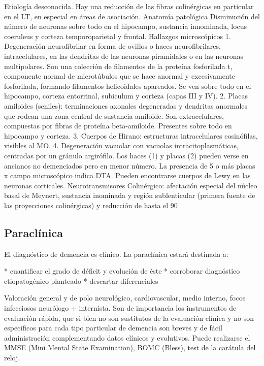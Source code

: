 Etiología desconocida. Hay una reducción de las fibras colinérgicas en particular en el LT, en especial en áreas de asociación. Anatomía patológica Disminución del número de neuronas sobre todo en el hipocampo, sustancia innominada, locus coeruleus y corteza temporoparietal y frontal. Hallazgos microscópicos 1. Degeneración neurofibrilar en forma de ovillos o haces neurofibrilares, intracelulares, en las dendritas de las neuronas piramidales o en las neuronas multipolares. Son una colección de filamentos de la proteína fosforilada t, componente normal de microtúbulos que se hace anormal y excesivamente fosforilada, formando filamentos helicoidales apareados. Se ven sobre todo en el hipocampo, corteza entorrinal, subiculum y corteza (capas III y IV). 2. Placas amiloides (seniles): terminaciones axonales degeneradas y dendritas anormales que rodean una zona central de sustancia amiloide. Son extracelulares, compuestas por fibras de proteína beta-amiloide. Presentes sobre todo en hipocampo y corteza. 3. Cuerpos de Hirano: estructuras intracelulares eosinófilas, visibles al MO. 4. Degeneración vacuolar con vacuolas intracitoplasmáticas, centradas por un gránulo argirófilo. Los haces (1) y placas (2) pueden verse en ancianos no demenciados pero en menor número. La presencia de 5 o más placas x campo microscópico indica DTA. Pueden encontrarse cuerpos de Lewy en las neuronas corticales. Neurotransmisores Colinérgico: afectación especial del núcleo basal de Meynert, sustancia inominada y región sublenticular (primera fuente de las proyecciones colinérgicas) y reducción de hasta el 90%
\subsection*{Paraclínica}
El diagnóstico de demencia es clínico. La paraclínica estará destinada a:

* cuantificar el grado de déficit y evolución de éste
* corroborar diagnóstico etiopatogénico planteado
* descartar diferenciales

Valoración general y de polo neurológico, cardiovascular, medio interno, focos infecciosos neurólogo + internista. Son de importancia los instrumentos de evaluación rápida, que si bien no son sustitutos de la evaluación clínica y no son específicos para cada tipo particular de demencia son breves y de fácil administración complementando datos clínicos y evolutivos. Puede realizarse el MMSE (Mini Mental State Examination), BOMC (Bless), test de la carátula del reloj.

